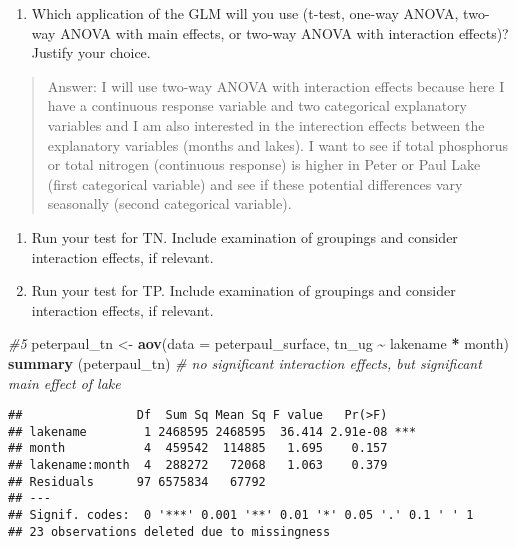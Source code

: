 \documentclass[
]{article}
\newenvironment{Shaded}{\begin{snugshade}}{\end{snugshade}}
\newcommand{\CommentTok}[1]{\textcolor[rgb]{0.56,0.35,0.01}{\textit{#1}}}
\newcommand{\DataTypeTok}[1]{\textcolor[rgb]{0.13,0.29,0.53}{#1}}
\newcommand{\KeywordTok}[1]{\textcolor[rgb]{0.13,0.29,0.53}{\textbf{#1}}}
\newcommand{\NormalTok}[1]{#1}
\newcommand{\OperatorTok}[1]{\textcolor[rgb]{0.81,0.36,0.00}{\textbf{#1}}}
\newcommand{\StringTok}[1]{\textcolor[rgb]{0.31,0.60,0.02}{#1}}
\providecommand{\tightlist}{%
  \setlength{\itemsep}{0pt}\setlength{\parskip}{0pt}}
\begin{document}
\begin{enumerate}
\def\labelenumi{\arabic{enumi}.}
\setcounter{enumi}{3}
\tightlist
\item
  Which application of the GLM will you use (t-test, one-way ANOVA,
  two-way ANOVA with main effects, or two-way ANOVA with interaction
  effects)? Justify your choice.
\end{enumerate}

\begin{quote}
Answer: I will use two-way ANOVA with interaction effects because here I
have a continuous response variable and two categorical explanatory
variables and I am also interested in the interection effects between
the explanatory variables (months and lakes). I want to see if total
phosphorus or total nitrogen (continuous response) is higher in Peter or
Paul Lake (first categorical variable) and see if these potential
differences vary seasonally (second categorical variable).
\end{quote}

\begin{enumerate}
\def\labelenumi{\arabic{enumi}.}
\setcounter{enumi}{4}
\item
  Run your test for TN. Include examination of groupings and consider
  interaction effects, if relevant.
\item
  Run your test for TP. Include examination of groupings and consider
  interaction effects, if relevant.
\end{enumerate}

\begin{Shaded}
\begin{Highlighting}[]
\CommentTok{\#5}
\NormalTok{peterpaul\_tn <{-}}\StringTok{ }\KeywordTok{aov}\NormalTok{(}\DataTypeTok{data =}\NormalTok{ peterpaul\_surface, tn\_ug }\OperatorTok{\textasciitilde{}}\StringTok{ }\NormalTok{lakename }\OperatorTok{*}\StringTok{ }\NormalTok{month)}
\KeywordTok{summary}\NormalTok{ (peterpaul\_tn) }\CommentTok{\# no significant interaction effects, but significant main effect of lake}
\end{Highlighting}
\end{Shaded}

\begin{verbatim}
##                Df  Sum Sq Mean Sq F value   Pr(>F)    
## lakename        1 2468595 2468595  36.414 2.91e-08 ***
## month           4  459542  114885   1.695    0.157    
## lakename:month  4  288272   72068   1.063    0.379    
## Residuals      97 6575834   67792                     
## ---
## Signif. codes:  0 '***' 0.001 '**' 0.01 '*' 0.05 '.' 0.1 ' ' 1
## 23 observations deleted due to missingness
\end{verbatim}
\end{document}
